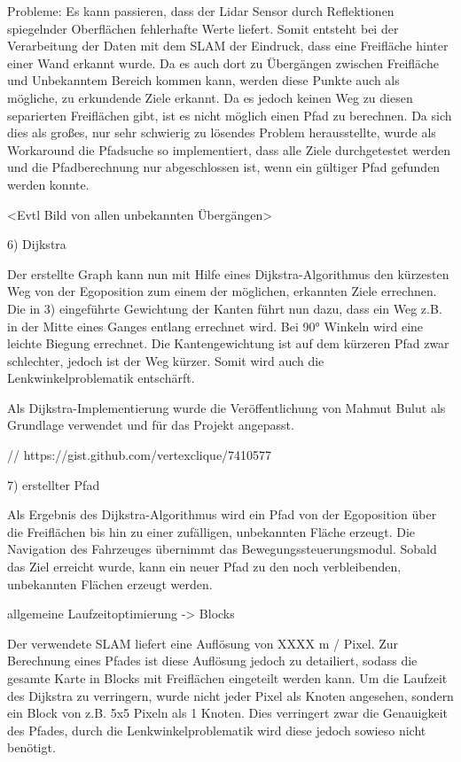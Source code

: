 Probleme:
Es kann passieren, dass der Lidar Sensor durch Reflektionen spiegelnder Oberflächen fehlerhafte Werte liefert. Somit entsteht bei der Verarbeitung der Daten mit dem SLAM der Eindruck, dass eine Freifläche hinter einer Wand erkannt wurde. Da es auch dort zu Übergängen zwischen Freifläche und Unbekanntem Bereich kommen kann, werden diese Punkte auch als mögliche, zu erkundende Ziele erkannt. Da es jedoch keinen Weg zu diesen separierten Freiflächen gibt, ist es nicht möglich einen Pfad zu berechnen. Da sich dies als großes, nur sehr schwierig zu lösendes Problem herausstellte, wurde als Workaround die Pfadsuche so implementiert, dass alle Ziele durchgetestet werden und die Pfadberechnung nur abgeschlossen ist, wenn ein gültiger Pfad gefunden werden konnte.

<Evtl Bild von allen unbekannten Übergängen>


6) Dijkstra

Der erstellte Graph kann nun mit Hilfe eines Dijkstra-Algorithmus den kürzesten Weg von der Egoposition zum einem der möglichen, erkannten Ziele errechnen. Die in 3) eingeführte Gewichtung der Kanten führt nun dazu, dass ein Weg z.B. in der Mitte eines Ganges entlang errechnet wird. Bei 90° Winkeln wird eine leichte Biegung errechnet. Die Kantengewichtung ist auf dem kürzeren Pfad zwar schlechter, jedoch ist der Weg kürzer. Somit wird auch die Lenkwinkelproblematik entschärft. 

Als Dijkstra-Implementierung wurde die Veröffentlichung von Mahmut Bulut als Grundlage verwendet und für das Projekt angepasst.

// https://gist.github.com/vertexclique/7410577


7) erstellter Pfad

Als Ergebnis des Dijkstra-Algorithmus wird ein Pfad von der Egoposition über die Freiflächen bis hin zu einer zufälligen, unbekannten Fläche erzeugt. Die Navigation des Fahrzeuges übernimmt das Bewegungssteuerungsmodul. Sobald das Ziel erreicht wurde, kann ein neuer Pfad zu den noch verbleibenden, unbekannten Flächen erzeugt werden.



allgemeine Laufzeitoptimierung -> Blocks

Der verwendete SLAM liefert eine Auflösung von XXXX m / Pixel. Zur Berechnung eines Pfades ist diese Auflösung jedoch zu detailiert, sodass die gesamte Karte in Blocks mit Freiflächen eingeteilt werden kann. Um die Laufzeit des Dijkstra zu verringern, wurde nicht jeder Pixel als Knoten angesehen, sondern ein Block von z.B. 5x5 Pixeln als 1 Knoten. Dies verringert zwar die Genauigkeit des Pfades, durch die Lenkwinkelproblematik wird diese jedoch sowieso nicht benötigt.



